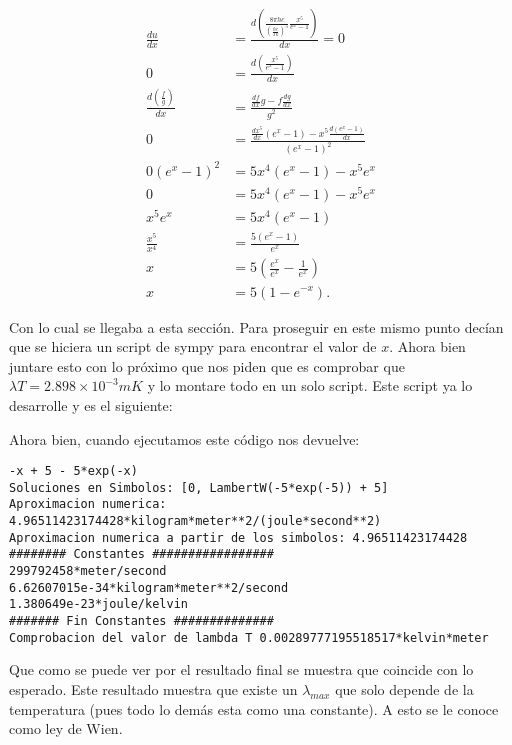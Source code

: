\documentclass{report}
\begin{document}
\begin{align*}
  \frac{du}{dx} &= \frac{ d\left(\frac{8\pi hc}{\left( \frac{hc}{Tk} \right)^{5}} \frac{x^{5}}{e^{x} - 1} \right)}{dx} = 0 \\
  0 &= \frac{d\left( \frac{x^{5}}{e^{x} - 1} \right) }{dx} \\
  \frac{d\left( \frac{f}{g} \right) }{dx} &= \frac{\frac{df}{dx}g - f \frac{dg}{dx}}{g^2} \\
  0 &= \frac{\frac{dx^{5}}{dx} \left( e^{x} - 1 \right) - x^{5} \frac{d\left( e^{x} - 1\right) }{dx}}{\left( e^{x} - 1 \right)^2}  \\
  0\left( e^{x} - 1 \right)^2 &= 5x^{4}\left( e^{x} - 1 \right) - x^{5}e^{x} \\
  0 &= 5x^{4}\left( e^{x} - 1 \right) - x^{5}e^{x} \\
  x^{5}e^{x} &= 5x^{4}\left( e^{x} - 1 \right)  \\
  \frac{x^{5}}{x^{4}} &= \frac{5\left( e^{x} - 1 \right) }{e^{x}} \\
  x &= 5 \left( \frac{e^{x}}{e^{x}} - \frac{1}{e^{x}} \right)  \\
  x &= 5\left( 1 - e^{-x} \right)
.\end{align*}

Con lo cual se llegaba a esta sección. Para proseguir en este mismo punto decían que se hiciera un script de sympy para encontrar el valor de $x$. Ahora bien juntare esto con lo próximo que nos piden que es comprobar que  $\lambda T = 2.898 \times 10^{-3}mK$ y lo montare todo en un solo script. Este script ya lo desarrolle y es el siguiente:



Ahora bien, cuando ejecutamos este código nos devuelve:
\begin{lstlisting}
-x + 5 - 5*exp(-x)
Soluciones en Simbolos: [0, LambertW(-5*exp(-5)) + 5]
Aproximacion numerica: 4.96511423174428*kilogram*meter**2/(joule*second**2)
Aproximacion numerica a partir de los simbolos: 4.96511423174428
######## Constantes #################
299792458*meter/second
6.62607015e-34*kilogram*meter**2/second
1.380649e-23*joule/kelvin
####### Fin Constantes ##############
Comprobacion del valor de lambda T 0.00289777195518517*kelvin*meter
\end{lstlisting}

Que como se puede ver por el resultado final se muestra que coincide con lo esperado. Este resultado muestra que existe un $\lambda_{max}$ que solo depende de la temperatura (pues todo lo demás esta como una constante). A esto se le conoce como ley de Wien.
\end{document}
